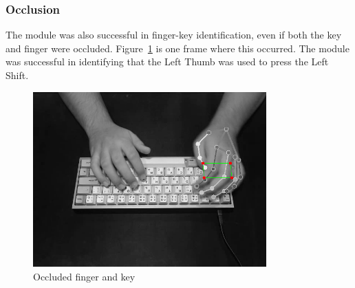 \documentclass[preprint,12pt,authoryear]{elsarticle}
\begin{document}
\subsubsection{Occlusion}
The module was also successful in finger-key identification, even if both the
key and finger were occluded. Figure~\ref{fig:rd-occluded} is one frame where
this occurred. The module was successful in identifying that the Left Thumb was
used to press the Left Shift.

\begin{figure}[H]
	\centering
	\includegraphics[width=0.8\textwidth]{occluded.png}
	\caption{Occluded finger and key}
	\label{fig:rd-occluded}
\end{figure}
\end{document}
